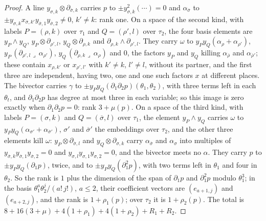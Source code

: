 \documentclass[11pt,reqno]{amsart}
\theoremstyle{plain}
\theoremstyle{definition}
\theoremstyle{remark}
\newcommand{\bbar}[1]{\overline{#1}}
\begin{document}
\begin{proof}
A line $y_{\sigma,k}\otimes\partial_{\bbar\sigma,k}$ carries $p$ to
$\pm y_{\sigma,k}^{2}(\cdots)=0$ and $\alpha_{\bbar\sigma}$ to
$\pm y_{\sigma,k}x_{\bbar\sigma,k'}y_{\bbar\sigma,1}y_{\bbar\sigma,2}\ne0$,
$k'\ne k$: rank one. On a space of the second kind, with labels
$P=(\rho,k)$ over $\tau_{1}$ and $Q=(\rho',l)$ over $\tau_{2}$, the four basis
elements are $y_{P}\wedge y_{Q}$, $y_{P}\otimes\partial_{\rho',l}$,
$y_{Q}\otimes\partial_{\rho,k}$ and $\partial_{\rho,k}\wedge\partial_{\rho',l}$.
They carry $\omega$ to $y_{P}y_{Q}(\alpha_{\rho}+\alpha_{\rho'})$,
$y_{P}\,(\partial_{\rho',l}\lrcorner\,\alpha_{\rho'})$,
$y_{Q}\,(\partial_{\rho,k}\lrcorner\,\alpha_{\rho})$ and $0$, the factors $y_{P}$
and $y_{Q}$ killing $\alpha_{\bbar\rho}$ and $\alpha_{\bbar\rho'}$; these
contain $x_{\rho,k'}$ or $x_{\rho',l'}$ with $k'\ne k$, $l'\ne l$, without its
partner, and the first three are independent, having two, one and one such
factors $x$ at different places. The bivector carries $\gamma$ to
$\pm y_{P}y_{Q}(\partial_{1}\partial_{2}p)(\theta_{1},\theta_{2})$, with three
terms left in each $\theta_{t}$, and $\partial_{1}\partial_{2}p$ has degree at
most three in each variable; so this image is zero exactly when
$\partial_{1}\partial_{2}p=0$: rank $3+\mu(p)$. On a space of the third kind,
with labels $P=(\sigma,k)$ and $Q=(\bbar\sigma,l)$ over $\tau_{1}$, the element
$y_{P}\wedge y_{Q}$ carries $\omega$ to $y_{P}y_{Q}(\alpha_{\sigma'}+
\alpha_{\bbar\sigma'})$, $\sigma'$ and $\bbar\sigma'$ the embeddings over
$\tau_{2}$, and the other three elements kill $\omega$: $y_{P}\otimes
\partial_{\bbar\sigma,l}$ and $y_{Q}\otimes\partial_{\sigma,k}$ carry
$\alpha_{\bbar\sigma}$ and $\alpha_{\sigma}$ into multiples of
$y_{\bbar\sigma,k}y_{\bbar\sigma,1}y_{\bbar\sigma,2}=0$ and
$y_{\sigma,l}y_{\sigma,1}y_{\sigma,2}=0$, and the bivector meets no
$\alpha$. They carry $p$ to $\pm y_{P}y_{Q}(\partial_{1}p)$, twice, and to
$\pm y_{P}y_{Q}(\partial_{1}^{2}p)$, with two terms left in $\theta_{1}$ and
four in $\theta_{2}$. So the rank is $1$ plus the dimension of the span of
$\partial_{1}p$ and $\partial_{1}^{2}p$ modulo $\theta_{1}^{3}$; in the basis
$\theta_{1}^{a}\theta_{2}^{j}/(a!\,j!)$, $a\le2$, their coefficient vectors are
$(e_{a+1,j})$ and $(e_{a+2,j})$, and the rank is $1+\rho_{1}(p)$; over
$\tau_{2}$ it is $1+\rho_{2}(p)$. The total is
$8+16(3+\mu)+4(1+\rho_{1})+4(1+\rho_{2})+R_{1}+R_{2}$.


\end{proof}
\end{document}
